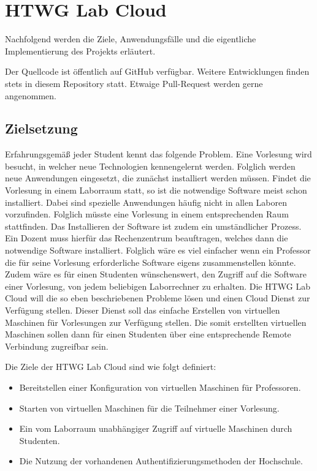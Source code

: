 \chapter{HTWG Lab Cloud}

Nachfolgend werden die Ziele, Anwendungsfälle und die eigentliche Implementierung des Projekts erläutert.

Der Quellcode ist öffentlich auf GitHub \cite{git-source} verfügbar. Weitere Entwicklungen finden stets in diesem Repository statt. Etwaige Pull-Request werden gerne angenommen.

\section{Zielsetzung}
Erfahrungsgemäß jeder Student kennt das folgende Problem. Eine Vorlesung wird
besucht, in welcher neue Technologien kennengelernt werden. Folglich werden neue Anwendungen
eingesetzt, die zunächst installiert werden müssen. 
Findet die Vorlesung in einem Laborraum statt, 
so ist die notwendige Software meist schon installiert.
Dabei sind spezielle Anwendungen häufig nicht in allen Laboren vorzufinden. Folglich müsste
eine Vorlesung in einem entsprechenden Raum stattfinden.
Das Installieren der Software ist zudem ein umständlicher Prozess. Ein Dozent muss hierfür
das Rechenzentrum beauftragen, welches dann die notwendige Software installiert.
Folglich wäre es viel einfacher wenn ein Professor die für seine Vorlesung erforderliche Software
eigens zusammenstellen könnte.
Zudem wäre es für einen Studenten wünschenswert, den Zugriff auf die Software einer Vorlesung,
von jedem beliebigen Laborrechner zu erhalten.
Die HTWG Lab Cloud will die so eben beschriebenen Probleme lösen und einen Cloud Dienst zur
Verfügung stellen. Dieser Dienst soll das einfache Erstellen von virtuellen Maschinen für
Vorlesungen zur Verfügung stellen. Die somit erstellten virtuellen Maschinen sollen dann für
einen Studenten über eine entsprechende Remote Verbindung zugreifbar sein.

Die Ziele der HTWG Lab Cloud sind wie folgt definiert:
\begin{itemize}
\item Bereitstellen einer Konfiguration von virtuellen Maschinen für Professoren.
\item Starten von virtuellen Maschinen für die Teilnehmer einer Vorlesung.
\item Ein vom Laborraum unabhängiger Zugriff auf virtuelle Maschinen durch Studenten.
\item Die Nutzung der vorhandenen Authentifizierungsmethoden der Hochschule.
\end{itemize}

